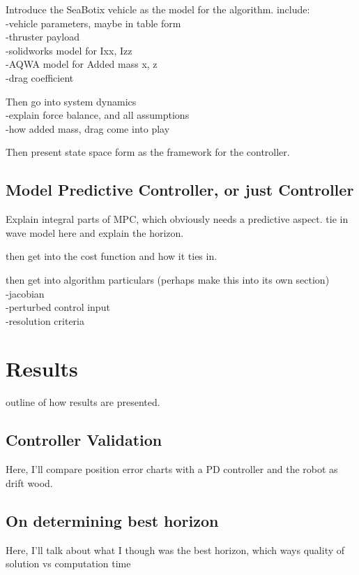 \documentclass[double,12pt]{beavtex}
\begin{document}
Introduce the SeaBotix vehicle as the model for the algorithm. include:
\\	-vehicle parameters, maybe in table form
\\	-thruster payload
\\	-solidworks model for Ixx, Izz
\\	-AQWA model for Added mass x, z
\\	-drag coefficient
	

Then go into system dynamics
\\	-explain force balance, and all assumptions
\\	-how added mass, drag come into play
	
Then present state space form as the framework for the controller.


\section{Model Predictive Controller, or just Controller}

Explain integral parts of MPC, which obviously needs a predictive aspect. tie in wave model here and explain the horizon.

then get into the cost function and how it ties in.

then get into algorithm particulars (perhaps make this into its own section)
\\	-jacobian
\\	-perturbed control input
\\	-resolution criteria



\chapter{Results}

outline of how results are presented. 

\section{Controller Validation}
Here, I'll compare position error charts with a PD controller and the robot as drift wood.

\section{On determining best horizon}	
Here, I'll talk about what I though was the best horizon, which ways quality of solution vs computation time
\end{document}
